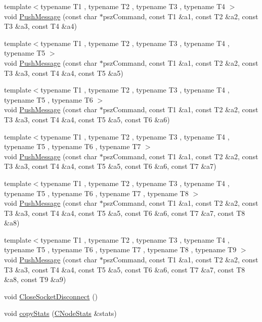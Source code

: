 \begin{DoxyCompactItemize}
\item 
{\footnotesize template$<$typename T1 , typename T2 , typename T3 , typename T4 $>$ }\\void \hyperlink{class_c_node_a2958ee10e2c96ef647787bce80196079}{Push\+Message} (const char $\ast$psz\+Command, const T1 \&a1, const T2 \&a2, const T3 \&a3, const T4 \&a4)
\item 
{\footnotesize template$<$typename T1 , typename T2 , typename T3 , typename T4 , typename T5 $>$ }\\void \hyperlink{class_c_node_a1f58deeed29baf57c49dae177f8be826}{Push\+Message} (const char $\ast$psz\+Command, const T1 \&a1, const T2 \&a2, const T3 \&a3, const T4 \&a4, const T5 \&a5)
\item 
{\footnotesize template$<$typename T1 , typename T2 , typename T3 , typename T4 , typename T5 , typename T6 $>$ }\\void \hyperlink{class_c_node_a4addbff355c502fb2f8c10451e76373d}{Push\+Message} (const char $\ast$psz\+Command, const T1 \&a1, const T2 \&a2, const T3 \&a3, const T4 \&a4, const T5 \&a5, const T6 \&a6)
\item 
{\footnotesize template$<$typename T1 , typename T2 , typename T3 , typename T4 , typename T5 , typename T6 , typename T7 $>$ }\\void \hyperlink{class_c_node_ab3611cdb08d5f25a4da05fe140e48625}{Push\+Message} (const char $\ast$psz\+Command, const T1 \&a1, const T2 \&a2, const T3 \&a3, const T4 \&a4, const T5 \&a5, const T6 \&a6, const T7 \&a7)
\item 
{\footnotesize template$<$typename T1 , typename T2 , typename T3 , typename T4 , typename T5 , typename T6 , typename T7 , typename T8 $>$ }\\void \hyperlink{class_c_node_af91d09012aa7e879be4b488b0bba903d}{Push\+Message} (const char $\ast$psz\+Command, const T1 \&a1, const T2 \&a2, const T3 \&a3, const T4 \&a4, const T5 \&a5, const T6 \&a6, const T7 \&a7, const T8 \&a8)
\item 
{\footnotesize template$<$typename T1 , typename T2 , typename T3 , typename T4 , typename T5 , typename T6 , typename T7 , typename T8 , typename T9 $>$ }\\void \hyperlink{class_c_node_a1af04d8219e8e6aafe5b6446000cd9ff}{Push\+Message} (const char $\ast$psz\+Command, const T1 \&a1, const T2 \&a2, const T3 \&a3, const T4 \&a4, const T5 \&a5, const T6 \&a6, const T7 \&a7, const T8 \&a8, const T9 \&a9)
\item 
void \hyperlink{class_c_node_a63a6091a0b0fc0987d9436e1ec708423}{Close\+Socket\+Disconnect} ()
\item 
void \hyperlink{class_c_node_aaa77188d9df85b80e3f8a30292acf6a9}{copy\+Stats} (\hyperlink{class_c_node_stats}{C\+Node\+Stats} \&stats)
\end{DoxyCompactItemize}
